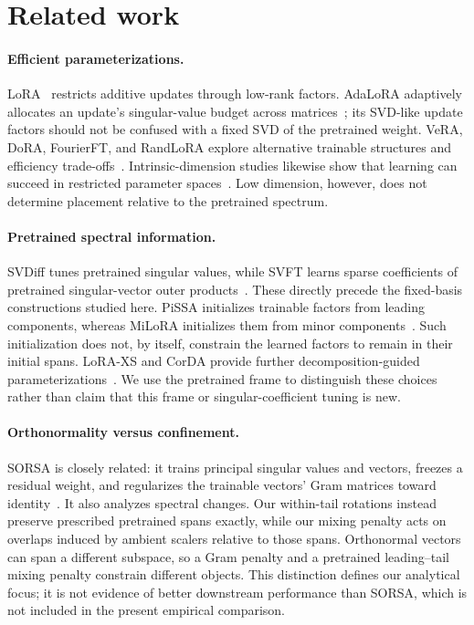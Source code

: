\section{Related work}
\label{sec:related}

\paragraph{Efficient parameterizations.}
LoRA~\citep{hu2022lora} restricts additive updates through low-rank factors. AdaLoRA adaptively allocates an update's singular-value budget across matrices~\citep{zhang2023adalora}; its SVD-like update factors should not be confused with a fixed SVD of the pretrained weight. VeRA, DoRA, FourierFT, and RandLoRA explore alternative trainable structures and efficiency trade-offs~\citep{kopiczko2023vera,liu2024dora,gao2024parameter,albert2025randlora}. Intrinsic-dimension studies likewise show that learning can succeed in restricted parameter spaces~\citep{li2018measuring,aghajanyan2020intrinsic}. Low dimension, however, does not determine placement relative to the pretrained spectrum.

\paragraph{Pretrained spectral information.}
SVDiff tunes pretrained singular values, while SVFT learns sparse coefficients of pretrained singular-vector outer products~\citep{han2023svdiff,lingam2024svft}. These directly precede the fixed-basis constructions studied here. PiSSA initializes trainable factors from leading components, whereas MiLoRA initializes them from minor components~\citep{meng2024pissa,wang2025milora}. Such initialization does not, by itself, constrain the learned factors to remain in their initial spans. LoRA-XS and CorDA provide further decomposition-guided parameterizations~\citep{balazy2024lora,yang2024corda}. We use the pretrained frame to distinguish these choices rather than claim that this frame or singular-coefficient tuning is new.

\paragraph{Orthonormality versus confinement.}
SORSA is closely related: it trains principal singular values and vectors, freezes a residual weight, and regularizes the trainable vectors' Gram matrices toward identity~\citep{cao2025sorsa}. It also analyzes spectral changes. Our within-tail rotations instead preserve prescribed pretrained spans exactly, while our mixing penalty acts on overlaps induced by ambient scalers relative to those spans. Orthonormal vectors can span a different subspace, so a Gram penalty and a pretrained leading--tail mixing penalty constrain different objects. This distinction defines our analytical focus; it is not evidence of better downstream performance than SORSA, which is not included in the present empirical comparison.

